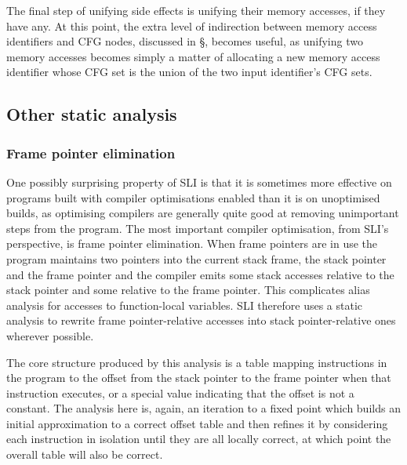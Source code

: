 
The final step of unifying side effects is unifying their memory
accesses, if they have any.  At this point, the extra level of
indirection between memory access identifiers and CFG nodes, discussed
in \S{}, becomes useful, as unifying two memory accesses
becomes simply a matter of allocating a new memory access identifier
whose CFG set is the union of the two input identifier's CFG
sets.


\subsection{Other static analysis}

\subsubsection{Frame pointer elimination}

One possibly surprising property of SLI is that it is sometimes more
effective on programs built with compiler optimisations enabled than
it is on unoptimised builds, as optimising compilers are generally
quite good at removing unimportant steps from the program.  The most
important compiler optimisation, from SLI's perspective, is frame
pointer elimination.  When frame pointers are in use the program
maintains two pointers into the current stack frame, the stack pointer
and the frame pointer and the compiler emits some stack accesses
relative to the stack pointer and some relative to the frame pointer.
This complicates alias analysis for accesses to function-local
variables.  SLI therefore uses a static analysis to rewrite frame
pointer-relative accesses into stack pointer-relative ones wherever
possible.

The core structure produced by this analysis is a table mapping
instructions in the program to the offset from the stack pointer to
the frame pointer when that instruction executes, or a special value
indicating that the offset is not a constant.  The analysis here is,
again, an iteration to a fixed point which builds an initial
approximation to a correct offset table and then refines it by
considering each instruction in isolation until they are all locally
correct, at which point the overall table will also be correct.

